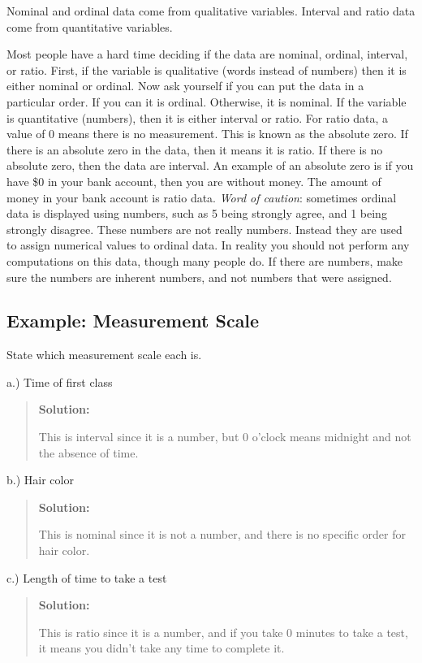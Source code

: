 \documentclass[]{book}
\begin{document}
Nominal and ordinal data come from qualitative variables. Interval and ratio data come from quantitative variables.

Most people have a hard time deciding if the data are nominal, ordinal, interval, or ratio. First, if the variable is qualitative (words instead of numbers) then it is either nominal or ordinal. Now ask yourself if you can put the data in a particular order. If you can it is ordinal. Otherwise, it is nominal. If the variable is quantitative (numbers), then it is either interval or ratio. For ratio data, a value of 0 means there is no measurement. This is known as the absolute zero. If there is an absolute zero in the data, then it means it is ratio. If there is no absolute zero, then the data are interval. An example of an absolute zero is if you have \$0 in your bank account, then you are without money. The amount of money in your bank account is ratio data. \emph{Word of caution}: sometimes ordinal data is displayed using numbers, such as 5 being strongly agree, and 1 being strongly disagree. These numbers are not really numbers. Instead they are used to assign numerical values to ordinal data. In reality you should not perform any computations on this data, though many people do. If there are numbers, make sure the numbers are inherent numbers, and not numbers that were assigned.

\hypertarget{example-measurement-scale}{%
\subsection{Example: Measurement Scale}\label{example-measurement-scale}}

State which measurement scale each is.

a.) Time of first class

\begin{quote}
\textbf{Solution:}

This is interval since it is a number, but 0 o'clock means midnight and not the absence of time.
\end{quote}

b.) Hair color

\begin{quote}
\textbf{Solution:}

This is nominal since it is not a number, and there is no specific order for hair color.
\end{quote}

c.) Length of time to take a test

\begin{quote}
\textbf{Solution:}

This is ratio since it is a number, and if you take 0 minutes to take a test, it means you didn't take any time to complete it.
\end{quote}
\end{document}
